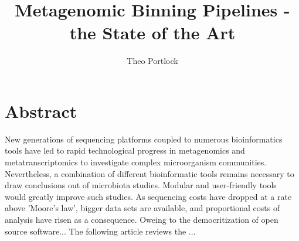 \documentclass{article}
\title{Metagenomic Binning Pipelines - the State of the Art}
\author{Theo Portlock}
\begin{document}
\maketitle

\section{Abstract}
New generations of sequencing platforms coupled to numerous bioinformatics tools have led to rapid technological progress in metagenomics and metatranscriptomics to investigate complex microorganism communities.
Nevertheless, a combination of different bioinformatic tools remains necessary to draw conclusions out of microbiota studies.
Modular and user-friendly tools would greatly improve such studies.
As sequencing costs have dropped at a rate above 'Moore's law', bigger data sets are available, and proportional costs of analysis have risen as a consequence.
Oweing to the democritization of open source software...
The following article reviews the ...
\end{document}
